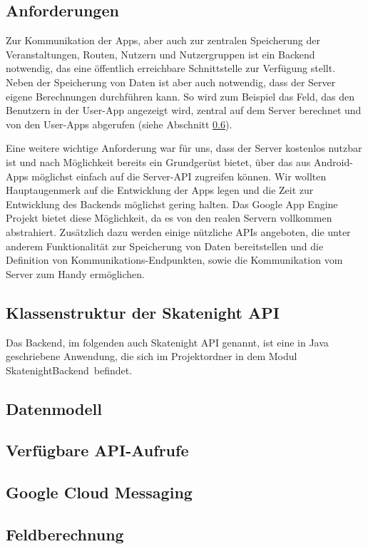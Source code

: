 \subsection{Anforderungen}
Zur Kommunikation der Apps, aber auch zur zentralen Speicherung der Veranstaltungen, Routen, Nutzern und Nutzergruppen ist ein Backend notwendig, das eine öffentlich erreichbare Schnittstelle zur Verfügung stellt. Neben der Speicherung von Daten ist aber auch notwendig, dass der Server eigene Berechnungen durchführen kann. So wird zum Beispiel das Feld, das den Benutzern in der User-App angezeigt wird, zentral auf dem Server berechnet und von den User-Apps abgerufen (siehe Abschnitt \ref{subsec:Feldberechnung}).

Eine weitere wichtige Anforderung war für uns, dass der Server kostenlos nutzbar ist und nach Möglichkeit bereits ein Grundgerüst bietet, über das aus Android-Apps möglichst einfach auf die Server-API zugreifen können. Wir wollten Hauptaugenmerk auf die Entwicklung der Apps legen und die Zeit zur Entwicklung des Backends möglichst gering halten. Das Google App Engine Projekt bietet diese Möglichkeit, da es von den realen Servern vollkommen abstrahiert. Zusätzlich dazu werden einige nützliche APIs angeboten, die unter anderem Funktionalität zur Speicherung von Daten bereitstellen und die Definition von Kommunikations-Endpunkten, sowie die Kommunikation vom Server zum Handy ermöglichen.


\subsection{Klassenstruktur der Skatenight API}
Das Backend, im folgenden auch Skatenight API genannt, ist eine in Java geschriebene Anwendung, die sich im Projektordner in dem Modul \glqq SkatenightBackend\grqq\ befindet. 

\subsection{Datenmodell}

\subsection{Verfügbare API-Aufrufe}

\subsection{Google Cloud Messaging}

\subsection{Feldberechnung}
\label{subsec:Feldberechnung}
